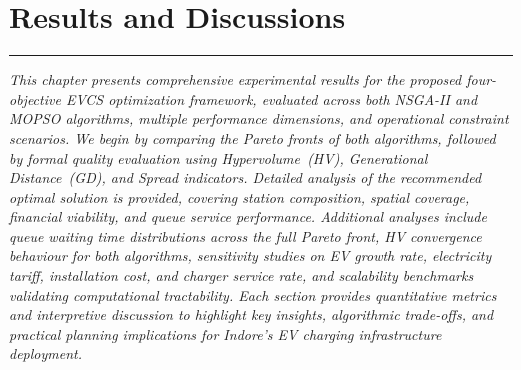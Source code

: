 \documentclass[12pt,phd,times]{pkmthesis}
\begin{document}
\label{chap:problem_statement}







\chapter{Results and Discussions}
\vspace{-1cm}
\noindent \rule{6.6in}{0.01in}
\noindent \emph{
This chapter presents comprehensive experimental results for the proposed
four-objective EVCS optimization framework, evaluated across both NSGA-II
and MOPSO algorithms, multiple performance dimensions, and operational
constraint scenarios. We begin by comparing the Pareto fronts of both
algorithms, followed by formal quality evaluation using Hypervolume~(HV),
Generational Distance~(GD), and Spread indicators. Detailed analysis of
the recommended optimal solution is provided, covering station composition,
spatial coverage, financial viability, and queue service performance.
Additional analyses include queue waiting time distributions across the
full Pareto front, HV convergence behaviour for both algorithms, sensitivity
studies on EV growth rate, electricity tariff, installation cost, and
charger service rate, and scalability benchmarks validating computational
tractability. Each section provides quantitative metrics and interpretive
discussion to highlight key insights, algorithmic trade-offs, and practical
planning implications for Indore's EV charging infrastructure deployment.}
\end{document}
